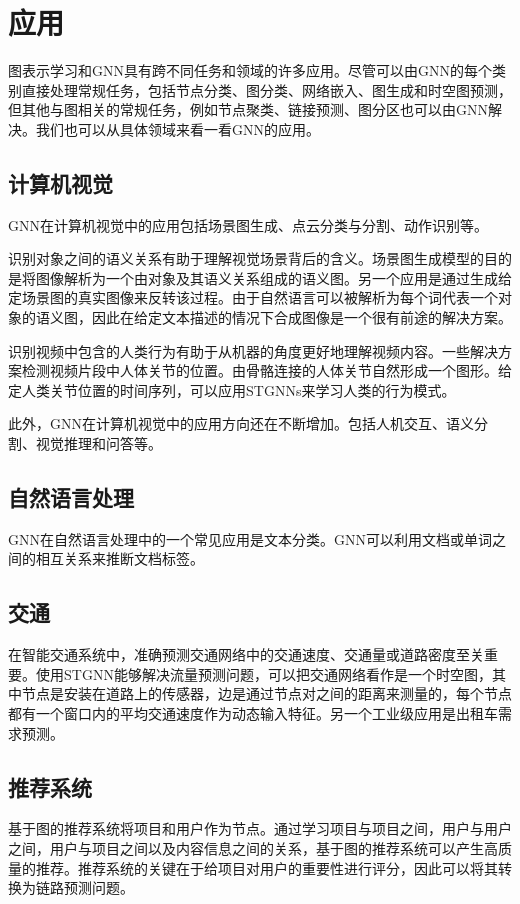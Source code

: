 \section{应用}
图表示学习和GNN具有跨不同任务和领域的许多应用。尽管可以由GNN的每个类别直接处理常规任务，包括节点分类、图分类、网络嵌入、图生成和时空图预测，但其他与图相关的常规任务，例如节点聚类、链接预测、图分区也可以由GNN解决。我们也可以从具体领域来看一看GNN的应用。

\subsection{计算机视觉}
 GNN在计算机视觉中的应用包括场景图生成、点云分类与分割、动作识别等。

识别对象之间的语义关系有助于理解视觉场景背后的含义。场景图生成模型的目的是将图像解析为一个由对象及其语义关系组成的语义图。另一个应用是通过生成给定场景图的真实图像来反转该过程。由于自然语言可以被解析为每个词代表一个对象的语义图，因此在给定文本描述的情况下合成图像是一个很有前途的解决方案。

识别视频中包含的人类行为有助于从机器的角度更好地理解视频内容。一些解决方案检测视频片段中人体关节的位置。由骨骼连接的人体关节自然形成一个图形。给定人类关节位置的时间序列，可以应用STGNNs来学习人类的行为模式。

此外，GNN在计算机视觉中的应用方向还在不断增加。包括人机交互、语义分割、视觉推理和问答等。

\subsection{自然语言处理}
GNN在自然语言处理中的一个常见应用是文本分类。GNN可以利用文档或单词之间的相互关系来推断文档标签。

\subsection{交通}
在智能交通系统中，准确预测交通网络中的交通速度、交通量或道路密度至关重要。使用STGNN能够解决流量预测问题，可以把交通网络看作是一个时空图，其中节点是安装在道路上的传感器，边是通过节点对之间的距离来测量的，每个节点都有一个窗口内的平均交通速度作为动态输入特征。另一个工业级应用是出租车需求预测。

\subsection{推荐系统}
基于图的推荐系统将项目和用户作为节点。通过学习项目与项目之间，用户与用户之间，用户与项目之间以及内容信息之间的关系，基于图的推荐系统可以产生高质量的推荐。推荐系统的关键在于给项目对用户的重要性进行评分，因此可以将其转换为链路预测问题。

